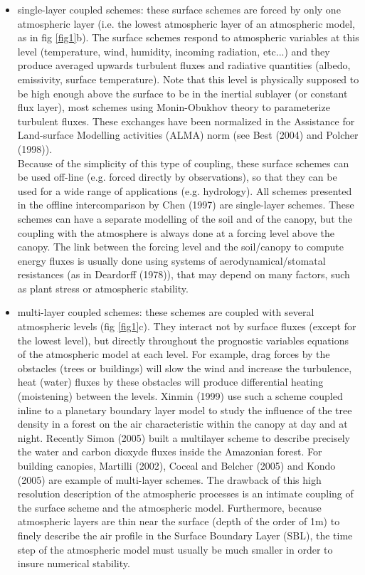 \begin{itemize}
\item single-layer coupled schemes: these surface schemes are forced by only one atmospheric layer (i.e. the lowest atmospheric layer of an atmospheric model, as in fig \ref{fig1}b). The surface schemes respond to atmospheric variables at this level (temperature, wind, humidity, incoming radiation, etc...) and they produce averaged upwards turbulent fluxes and radiative quantities (albedo, emissivity, surface temperature). Note that this level is physically supposed to be high enough above the surface to be in the inertial sublayer (or constant flux layer), most schemes using Monin-Obukhov theory to parameterize turbulent fluxes. These exchanges have been normalized in the Assistance for Land-surface Modelling activities (ALMA) norm (see Best \etal (2004)\nocite{Best2004} and Polcher \etal (1998)\nocite{Polcher1998}).\\
 Because of the simplicity of this type of coupling, these surface schemes can be used off-line (e.g. forced directly by observations), so that they can be used for a wide range of applications (e.g. hydrology). All schemes presented in the offline intercomparison by Chen \etal (1997)\nocite{Chen1997} are single-layer schemes. These schemes can have a separate modelling  of the soil and of the canopy, but the coupling with the atmosphere is always done at a forcing level above the canopy. The link between the forcing level and the soil/canopy to compute energy fluxes is usually done using systems of aerodynamical/stomatal resistances (as in Deardorff (1978)\nocite{Deardorff1978}), that may depend on many factors, such as plant stress or atmospheric stability.
\item multi-layer coupled schemes: these schemes are coupled with several atmospheric levels (fig \ref{fig1}c). They interact not by surface fluxes (except for the lowest level), but directly throughout the prognostic variables equations of the atmospheric model at each level. For example, drag forces by the obstacles (trees or buildings) will slow the wind and increase the turbulence, heat (water) fluxes by these obstacles will produce differential heating (moistening) between the levels. Xinmin \etal (1999)\nocite{Xinmin1999} use such a scheme coupled inline to a planetary boundary layer model to study the influence of the tree density in a forest on the air characteristic within the canopy at day and at night. Recently Simon \etal (2005)\nocite{Simon2005} built a multilayer scheme to describe precisely the water and carbon dioxyde fluxes inside the Amazonian forest. For building canopies, Martilli \etal (2002)\nocite{Martilli2002}, Coceal and Belcher (2005)\nocite{Coceal2005} and Kondo \etal (2005)\nocite{Kondo2005} are example of multi-layer schemes. The drawback of this high resolution description of the atmospheric processes is an intimate coupling of the surface scheme and the atmospheric model. Furthermore, because atmospheric layers are thin near the surface (depth of the order of 1m) to finely describe the air profile in the Surface Boundary Layer (SBL), the time step of the atmospheric model must usually be much smaller in order to insure numerical stability. \\

\end{itemize}
